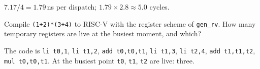 \begin{solution}
$7.17/4=1.79$\,ns per dispatch; $1.79\times2.8\approx5.0$ cycles.
\end{solution}
\begin{exercise}[medium]
Compile \texttt{(1+2)*(3+4)} to RISC-V with the register scheme of
\texttt{gen\_rv}. How many temporary registers are live at the
busiest moment, and which?
\end{exercise}
\begin{solution}
The code is \texttt{li t0,1}, \texttt{li t1,2}, \texttt{add t0,t0,t1}, \texttt{li t1,3}, \texttt{li t2,4}, \texttt{add t1,t1,t2}, \texttt{mul t0,t0,t1}.
At the busiest point \texttt{t0}, \texttt{t1}, \texttt{t2} are live: three.
\end{solution}
